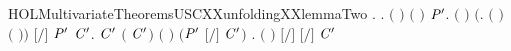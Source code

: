 \newcommand{\HOLMultivariateTheoremsUSCXXunfoldingXXlemmaOne}{\UseVerbatim{HOLMultivariateTheoremsUSCXXunfoldingXXlemmaOne}}
\begin{SaveVerbatim}{HOLMultivariateTheoremsUSCXXunfoldingXXlemmaTwo}
\HOLTokenTurnstile{} \HOLSymConst{\HOLTokenForall{}}.
         \HOLSymConst{\HOLTokenImp{}}
       \HOLSymConst{\HOLTokenForall{}}.
              \HOLSymConst{\HOLTokenConj{}}  \ensuremath{(} \ensuremath{)} \ensuremath{(} \ensuremath{)} \HOLSymConst{\HOLTokenImp{}}
           \HOLSymConst{\HOLTokenForall{}}  \ensuremath{\HOLBoundVar{P}\sp{\prime}}.
               \ensuremath{(}  \HOLSymConst{\ensuremath{=}}  \ensuremath{)} \HOLSymConst{\HOLTokenConj{}}   \HOLSymConst{\HOLTokenConj{}}
                \ensuremath{(}\HOLTokenLambda{}.  \ensuremath{(} \ensuremath{)} \ensuremath{(} \ensuremath{)}\ensuremath{)}  \HOLSymConst{\HOLTokenConj{}}
               \ensuremath{[}\ensuremath{/}\ensuremath{]}  \HOLTokenTransBegin{}\HOLTokenTransEnd \ensuremath{\HOLBoundVar{P}\sp{\prime}} \HOLSymConst{\HOLTokenImp{}}
               \HOLSymConst{\HOLTokenExists{}}\ensuremath{\HOLBoundVar{C}\sp{\prime}}.
                     \ensuremath{\HOLBoundVar{C}\sp{\prime}} \HOLSymConst{\HOLTokenConj{}}  \ensuremath{(} \ensuremath{\HOLBoundVar{C}\sp{\prime}}\ensuremath{)} \ensuremath{(} \ensuremath{)} \HOLSymConst{\HOLTokenConj{}}
                   \ensuremath{(}\ensuremath{\HOLBoundVar{P}\sp{\prime}} \HOLSymConst{\ensuremath{=}} \ensuremath{[}\ensuremath{/}\ensuremath{]} \ensuremath{\HOLBoundVar{C}\sp{\prime}}\ensuremath{)} \HOLSymConst{\HOLTokenConj{}}
                   \HOLSymConst{\HOLTokenForall{}}.
                       \ensuremath{(}  \HOLSymConst{\ensuremath{=}}  \ensuremath{)} \HOLSymConst{\HOLTokenImp{}}
                       \ensuremath{[}\ensuremath{/}\ensuremath{]}  \HOLTokenTransBegin{}\HOLTokenTransEnd \ensuremath{[}\ensuremath{/}\ensuremath{]} \ensuremath{\HOLBoundVar{C}\sp{\prime}}
\end{SaveVerbatim}
